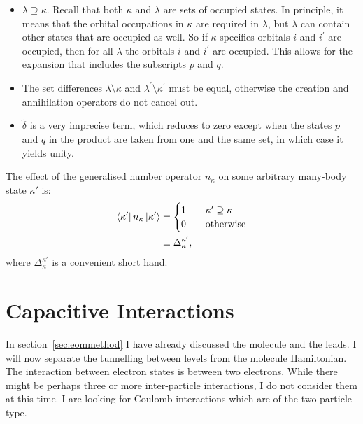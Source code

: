 \begin{itemize}
\item $\lambda\supseteq\kappa$. Recall that both $\kappa$ and $\lambda$ are sets of occupied states. In principle, it means that the orbital occupations in $\kappa$ are required in $\lambda$, but $\lambda$ can contain other states that are occupied as well. So if $\kappa$ specifies orbitals $i$ and $i^\prime$ are occupied, then for all $\lambda$ the orbitals $i$ and $i^\prime$ are occupied. This allows for the expansion that includes the subscripts $p$ and $q$.
\item The set differences $\lambda\setminus{\kappa}$ and $\lambda^\prime\setminus{\kappa^\prime}$ must be equal, otherwise the creation and annihilation operators do not cancel out. 
\item $\tilde{\delta}$ is a very imprecise term, which reduces to zero except when the states $p$ and $q$ in the product are taken from one and the same set, in which case it yields unity.
\end{itemize}
The effect of the generalised number operator $n_\kappa$ on some arbitrary many-body state $\kappa'$ is:
\begin{align}
\bra{\kappa'} n_\kappa \ket{\kappa'} &= \begin{cases} 1 &\quad \kappa'\supseteq\kappa \\
0 & \quad \text{otherwise} \end{cases}
\label{eq:generalisednumberoperator}\\
&\equiv \Delta^{\kappa'}_{\kappa},\nonumber
\end{align}
where $\Delta^{\kappa'}_{\kappa}$ is a convenient short hand.

\section{Capacitive Interactions} 
\label{sec:capacitive}
In section~\ref{sec:eommethod} I have already discussed the molecule and the leads. I will now separate the tunnelling between levels from the molecule Hamiltonian. The interaction between electron states is between two electrons. While there might be perhaps three or more inter-particle interactions, I do not consider them at this time. I are looking for Coulomb interactions which are of the two-particle type.

